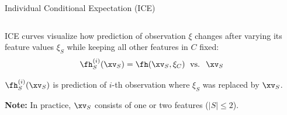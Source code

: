 \documentclass[11pt,compress,t,notes=noshow, aspectratio=169, xcolor=table]{beamer}
\begin{document}
\begin{frame}{Individual Conditional Expectation (ICE) }
\begin{columns}[T]
\begin{column}{0.82\textwidth}
ICE curves visualize how prediction of observation $\xi$ changes after varying its feature values $\xi_S$ while keeping all other features in $C$ fixed:
$$\fh_{S}^{(i)}(\xv_S) = \fh(\xv_S, \xi_C) \; \text{ vs. } \; \xv_S$$

$\fh_{S}^{(i)}(\xv_S)$ is prediction of $i$-th observation where $\xi_S$ was replaced by $\xv_S$.

\textbf{Note:} In practice, $\xv_S$ consists of one or two features ($|S| \leq 2$).

\end{column}
\end{columns}



%
\end{frame}
\end{document}

